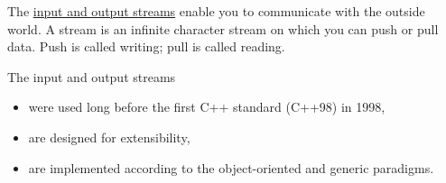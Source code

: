
The \href{http://en.cppreference.com/w/cpp/header/iostream}{input and output streams} enable you to communicate with the outside world. A stream is an infinite character stream on which you can push or pull data. Push is called writing; pull is called reading.

The input and output streams

\begin{itemize}
\item 
were used long before the first C++ standard (C++98) in 1998,

\item 
are designed for extensibility,

\item 
are implemented according to the object-oriented and generic paradigms.
\end{itemize}
























































